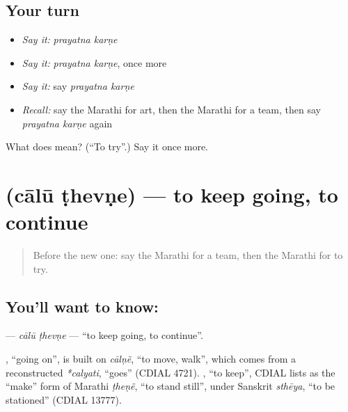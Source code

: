 \subsection*{Your turn}
\begin{itemize}
\raggedright
  \item \emph{Say it:} \emph{prayatna karṇe}
  \item \emph{Say it:} \emph{prayatna karṇe}, once more
  \item \emph{Say it:} say \emph{prayatna karṇe}
  \item \emph{Recall:} say the Marathi for art, then the Marathi for a team, then say \emph{prayatna karṇe} again
\end{itemize}

\begin{tcolorbox}[breakable,colback=teal!4,colframe=teal!35!black,title={Before you move on}]
What does   mean? (\textquotedblleft{}To try\textquotedblright{}.) Say it once more.
\end{tcolorbox}
\section[\texorpdfstring{\mr{चालू} \mr{ठेवणे} (cālū ṭhevṇe)}{चालू ठेवणे (cālū ṭhevṇe)}]{  (cālū ṭhevṇe) — to keep going, to continue}

\label{lesson:MR-C251-calu-thevne}



\begin{quote}
Before the new one: say the Marathi for a team, then the Marathi for to try.
\end{quote}

\subsection*{You'll want to know:  }
\textbf{ } — \emph{cālū ṭhevṇe} — \textquotedblleft{}to keep going, to continue\textquotedblright{}.

\begin{cousinweb}
\textbf{}, \textquotedblleft{}going on\textquotedblright{}, is built on \emph{cālṇẽ}, \textquotedblleft{}to move, walk\textquotedblright{}, which comes from a reconstructed \emph{*calyati}, \textquotedblleft{}goes\textquotedblright{} (CDIAL 4721). \textbf{}, \textquotedblleft{}to keep\textquotedblright{}, CDIAL lists as the \textquotedblleft{}make\textquotedblright{} form of Marathi \emph{ṭheṇẽ}, \textquotedblleft{}to stand still\textquotedblright{}, under Sanskrit \emph{sthēya}, \textquotedblleft{}to be stationed\textquotedblright{} (CDIAL 13777).
\end{cousinweb}

